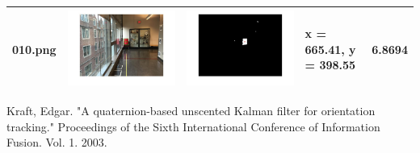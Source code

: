 \documentclass[fleqn,10pt]{SelfArx} %
\begin{document}
\begin{table}
\begin{tabular}{>{\centering\arraybackslash}M{15mm}cc>{\centering\arraybackslash}M{11mm}>{\centering\arraybackslash}M{15mm}}
\vspace{-4cm}010.png & \includegraphics[trim={3cm 2cm 3cm 2cm},clip,scale=0.28]{results/010.jpg} & \includegraphics[trim={3cm 2cm 3cm 2cm},clip,scale=0.28]{results/010s.jpg} & \vspace{-4cm} x = 665.41, y = 398.55 & \vspace{-4cm}6.8694 \\ 
\hline 
\end{tabular} 
\end{table}

\begin{thebibliography}{9}
Kraft, Edgar. "A quaternion-based unscented Kalman filter for orientation tracking." Proceedings of the Sixth International Conference of Information Fusion. Vol. 1. 2003.
\end{thebibliography}




\end{document}
